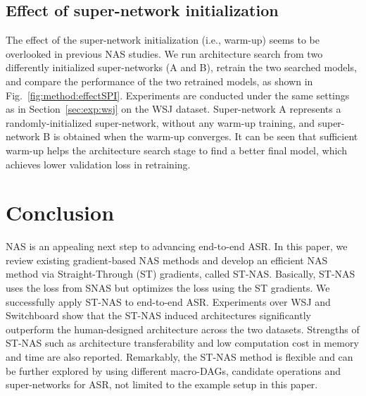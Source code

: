 \documentclass{article}
\newcommand{\figref}{Fig.~\ref}
\newcommand{\secref}{Section~\ref}
\begin{document}
\subsection{Effect of super-network initialization}
\label{sec:method:effectSI}
\vspace{-1mm}
The effect of the super-network initialization (i.e., warm-up) seems to be overlooked in previous NAS studies.
We run architecture search from two differently initialized super-networks (A and B), retrain the two searched models, and compare the performance of the two retrained models, as shown in \figref{fig:method:effectSPI}.
Experiments are conducted under the same settings as in \secref{sec:exp:wsj} on the WSJ dataset.
Super-network A represents a randomly-initialized super-network, without any warm-up training, and super-network B is obtained when the warm-up converges.
It can be seen that sufficient warm-up helps the architecture search stage to find a better final model, which achieves lower validation loss in retraining.



\section{Conclusion}
\label{sec:conclusion}
NAS is an appealing next step to advancing end-to-end ASR.
In this paper, we review existing gradient-based NAS methods and develop an efficient NAS method via Straight-Through (ST) gradients, called ST-NAS.
Basically, ST-NAS uses the loss from SNAS but optimizes the loss using the ST gradients.
We successfully apply ST-NAS to end-to-end ASR.
Experiments over WSJ and Switchboard show that the ST-NAS induced architectures significantly outperform the human-designed architecture across the two datasets. Strengths of ST-NAS such as architecture transferability and low computation cost in memory and time are also reported.
Remarkably, the ST-NAS method is flexible and can be further explored by using different macro-DAGs, candidate operations and super-networks for ASR, not limited to the example setup in this paper.



\end{document}
